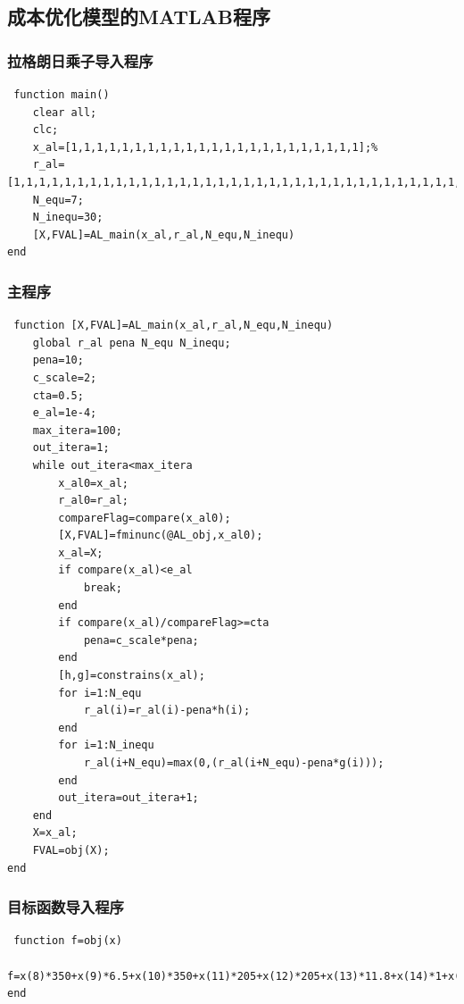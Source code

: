 \documentclass[12pt]{article}%
\begin{document}
 \subsection{成本优化模型的MATLAB程序}
 \subsubsection{拉格朗日乘子导入程序}
 \begin{lstlisting}
 function main()
    clear all;
    clc;
    x_al=[1,1,1,1,1,1,1,1,1,1,1,1,1,1,1,1,1,1,1,1,1,1,1];%
    r_al=[1,1,1,1,1,1,1,1,1,1,1,1,1,1,1,1,1,1,1,1,1,1,1,1,1,1,1,1,1,1,1,1,1,1,1,1,1,1,1,1,1,1,1];
    N_equ=7;
    N_inequ=30;
    [X,FVAL]=AL_main(x_al,r_al,N_equ,N_inequ)
end
 \end{lstlisting}
  \subsubsection{主程序}
 \begin{lstlisting}
 function [X,FVAL]=AL_main(x_al,r_al,N_equ,N_inequ)
	global r_al pena N_equ N_inequ;
	pena=10;
	c_scale=2;
	cta=0.5;
	e_al=1e-4;
	max_itera=100;
	out_itera=1;
	while out_itera<max_itera
		x_al0=x_al;
		r_al0=r_al;
		compareFlag=compare(x_al0);
		[X,FVAL]=fminunc(@AL_obj,x_al0);
		x_al=X;
		if compare(x_al)<e_al
			break;
		end
		if compare(x_al)/compareFlag>=cta
			pena=c_scale*pena;
		end
		[h,g]=constrains(x_al);
		for i=1:N_equ
			r_al(i)=r_al(i)-pena*h(i);
		end
		for i=1:N_inequ
			r_al(i+N_equ)=max(0,(r_al(i+N_equ)-pena*g(i)));
		end
		out_itera=out_itera+1;
	end
	X=x_al;
	FVAL=obj(X);
end
 \end{lstlisting}
   \subsubsection{目标函数导入程序}
 \begin{lstlisting}
 function f=obj(x)
	f=x(8)*350+x(9)*6.5+x(10)*350+x(11)*205+x(12)*205+x(13)*11.8+x(14)*1+x(15)*8.5+x(16)*7.6+x(17)*6+x(18)*6+x(19)*4.6+x(20)*8.15+x(21)*8.15+x(22)*6.1+x(23)*4;
end
 \end{lstlisting}
\end{document}
